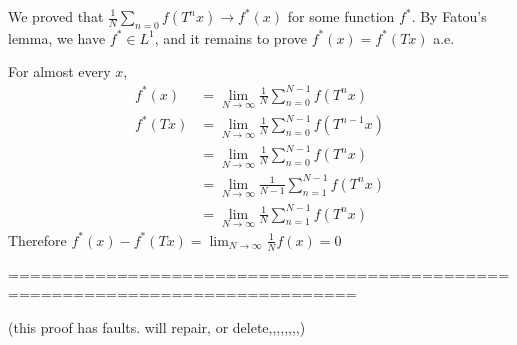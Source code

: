 \documentclass[10pt,a4paper]{report}
\newenvironment{proof}
{\begin{changemargin}{1cm}{0.5cm} 
	}%
	{\end{changemargin}
}
\begin{document}
\begin{proof}
\quad We proved that $\frac{1}{N} \sum_{n=0} f(T^n x) \rightarrow f^*(x)$ for some function $f^*$. By Fatou's lemma, we have $f^* \in L^1$, and it remains to prove $f^*(x) = f^*(Tx)$ a.e.

\quad For almost every $x$,
\begin{align*}
f^*(x) &= \lim_{N\rightarrow \infty} \frac{1}{N} \sum_{n=0}^{N-1}f(T^n x) \\
f^*(Tx) &= \lim_{N\rightarrow \infty} \frac{1}{N} \sum_{n=0}^{N-1} f(T^{n-1} x) \\
&= \lim_{N\rightarrow \infty} \frac{1}{N} \sum_{n=0}^{N-1} f(T^n x) \\
&= \lim_{N\rightarrow \infty} \frac{1}{N-1} \sum_{n=1}^{N-1} f(T^n x) \\
&= \lim_{N\rightarrow \infty} \frac{1}{N} \sum_{n=1}^{N-1} f(T^n x)
\end{align*}
Therefore $f^*(x) - f^*(Tx) = \lim_{N\rightarrow \infty} \frac{1}{N}f(x) = 0$ 

\eop
\end{proof}

==============================================================================

(this proof has faults. will repair, or delete,,,,,,,,)
\end{document}
